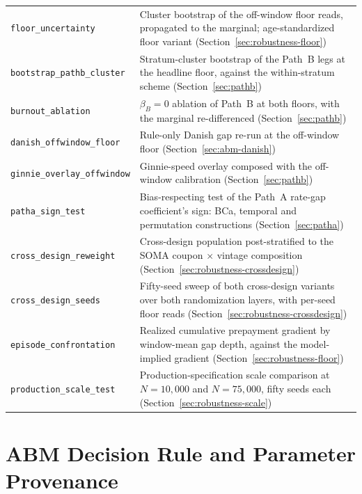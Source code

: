 \documentclass[12pt]{article}
\begin{document}
\begin{table}[H]
\begin{threeparttable}
\begin{tabular}{@{}p{5.4cm}p{8.8cm}@{}}
\texttt{floor\_uncertainty} & Cluster bootstrap of the off-window floor reads, propagated to the marginal; age-standardized floor variant (Section~\ref{sec:robustness-floor}) \\
\texttt{bootstrap\_pathb\_cluster} & Stratum-cluster bootstrap of the Path~B legs at the headline floor, against the within-stratum scheme (Section~\ref{sec:pathb}) \\
\texttt{burnout\_ablation} & $\beta_B = 0$ ablation of Path~B at both floors, with the marginal re-differenced (Section~\ref{sec:pathb}) \\
\texttt{danish\_offwindow\_floor} & Rule-only Danish gap re-run at the off-window floor (Section~\ref{sec:abm-danish}) \\
\texttt{ginnie\_overlay\_offwindow} & Ginnie-speed overlay composed with the off-window calibration (Section~\ref{sec:pathb}) \\
\texttt{patha\_sign\_test} & Bias-respecting test of the Path~A rate-gap coefficient's sign: BCa, temporal and permutation constructions (Section~\ref{sec:patha}) \\
\texttt{cross\_design\_reweight} & Cross-design population post-stratified to the SOMA coupon $\times$ vintage composition (Section~\ref{sec:robustness-crossdesign}) \\
\texttt{cross\_design\_seeds} & Fifty-seed sweep of both cross-design variants over both randomization layers, with per-seed floor reads (Section~\ref{sec:robustness-crossdesign}) \\
\texttt{episode\_confrontation} & Realized cumulative prepayment gradient by window-mean gap depth, against the model-implied gradient (Section~\ref{sec:robustness-floor}) \\
\texttt{production\_scale\_test} & Production-specification scale comparison at $N = 10{,}000$ and $N = 75{,}000$, fifty seeds each (Section~\ref{sec:robustness-scale}) \\
\bottomrule
\end{tabular}
\end{threeparttable}
\end{table}

\section{ABM Decision Rule and Parameter Provenance}\label{app:abmspec}
\end{document}
